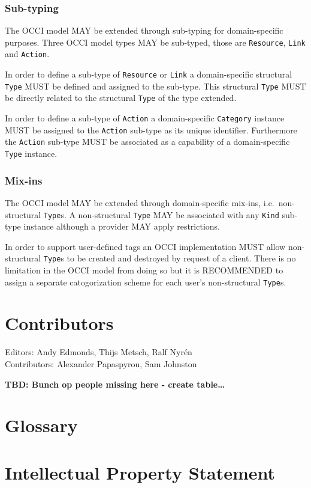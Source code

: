 \documentclass[10pt,a4paper,british]{article}
\newcommand{\hl}{\texttt}
\begin{document}
\subsubsection{Sub-typing}
The OCCI model MAY be extended through sub-typing for domain-specific purposes.
Three OCCI model types MAY be sub-typed, those are \hl{Resource}, \hl{Link} and
\hl{Action}.

In order to define a sub-type of \hl{Resource} or \hl{Link} a domain-specific
structural \hl{Type} MUST be defined and assigned to the sub-type. This
structural \hl{Type} MUST be directly related to the structural \hl{Type} of
the type extended.

In order to define a sub-type of \hl{Action} a domain-specific \hl{Category}
instance MUST be assigned to the \hl{Action} sub-type as its unique identifier.
Furthermore the \hl{Action} sub-type MUST be associated as a capability of a
domain-specific \hl{Type} instance.

\subsubsection{Mix-ins}
The OCCI model MAY be extended through domain-specific mix-ins,
i.e.~non-structural \hl{Type}s.  A non-structural \hl{Type} MAY be associated
with any \hl{Kind} sub-type instance although a provider MAY apply
restrictions.

In order to support user-defined tags an OCCI implementation MUST allow
non-structural \hl{Type}s to be created and destroyed by request of a client.
There is no limitation in the OCCI model from doing so but it is RECOMMENDED to
assign a separate catogorization scheme for each user's non-structural
\hl{Type}s.

\section{Contributors}
Editors: Andy Edmonds, Thijs Metsch, Ralf Nyrén \\
Contributors: Alexander Papaspyrou, Sam Johnston

\textbf{TBD: Bunch op people missing here - create table\ldots}

\section{Glossary}
\label{sec:glossary}



\section{Intellectual Property Statement}

\end{document}
